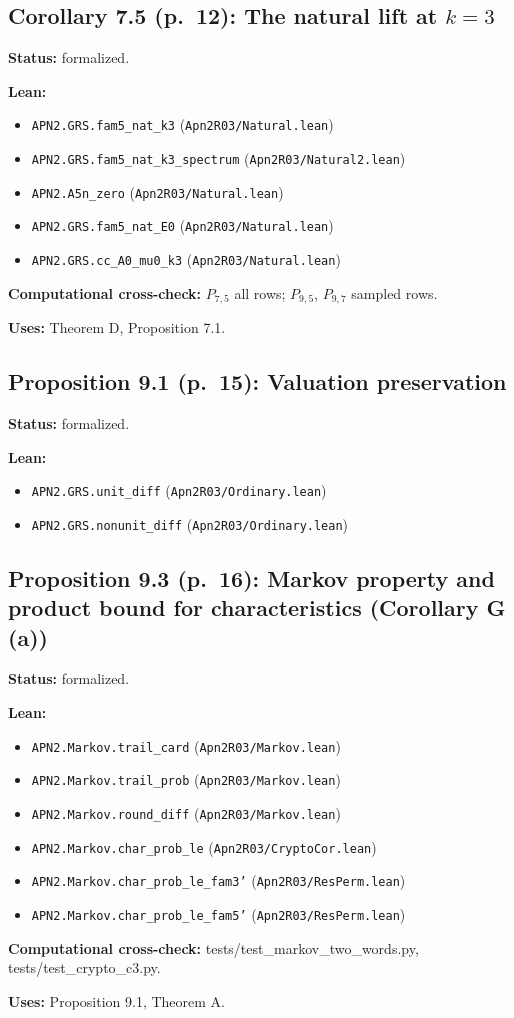 \documentclass[11pt]{article}
\begin{document}
\subsection*{Corollary 7.5 (p.~12): The natural lift at $k=3$}
\textbf{Status:} formalized.\par
\textbf{Lean:}\begin{itemize}\setlength\itemsep{0pt}
\item \texttt{APN2.GRS.fam5\_nat\_k3} \hfill (\texttt{Apn2R03/Natural.lean})
\item \texttt{APN2.GRS.fam5\_nat\_k3\_spectrum} \hfill (\texttt{Apn2R03/Natural2.lean})
\item \texttt{APN2.A5n\_zero} \hfill (\texttt{Apn2R03/Natural.lean})
\item \texttt{APN2.GRS.fam5\_nat\_E0} \hfill (\texttt{Apn2R03/Natural.lean})
\item \texttt{APN2.GRS.cc\_A0\_mu0\_k3} \hfill (\texttt{Apn2R03/Natural.lean})
\end{itemize}
\textbf{Computational cross-check:} $P_{7,5}$ all rows; $P_{9,5}$, $P_{9,7}$ sampled rows.\par
\textbf{Uses:} Theorem D, Proposition 7.1.\par
\subsection*{Proposition 9.1 (p.~15): Valuation preservation}
\textbf{Status:} formalized.\par
\textbf{Lean:}\begin{itemize}\setlength\itemsep{0pt}
\item \texttt{APN2.GRS.unit\_diff} \hfill (\texttt{Apn2R03/Ordinary.lean})
\item \texttt{APN2.GRS.nonunit\_diff} \hfill (\texttt{Apn2R03/Ordinary.lean})
\end{itemize}
\subsection*{Proposition 9.3 (p.~16): Markov property and product bound for characteristics (Corollary G (a))}
\textbf{Status:} formalized.\par
\textbf{Lean:}\begin{itemize}\setlength\itemsep{0pt}
\item \texttt{APN2.Markov.trail\_card} \hfill (\texttt{Apn2R03/Markov.lean})
\item \texttt{APN2.Markov.trail\_prob} \hfill (\texttt{Apn2R03/Markov.lean})
\item \texttt{APN2.Markov.round\_diff} \hfill (\texttt{Apn2R03/Markov.lean})
\item \texttt{APN2.Markov.char\_prob\_le} \hfill (\texttt{Apn2R03/CryptoCor.lean})
\item \texttt{APN2.Markov.char\_prob\_le\_fam3'} \hfill (\texttt{Apn2R03/ResPerm.lean})
\item \texttt{APN2.Markov.char\_prob\_le\_fam5'} \hfill (\texttt{Apn2R03/ResPerm.lean})
\end{itemize}
\textbf{Computational cross-check:} tests/test\_markov\_two\_words.py, tests/test\_crypto\_c3.py.\par
\textbf{Uses:} Proposition 9.1, Theorem A.\par
\end{document}

